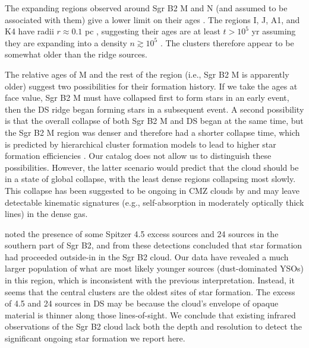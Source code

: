 \documentclass[twocolumn]{aastex61}
\begin{document}
The expanding \hii regions observed around Sgr B2 M and N (and assumed to be
associated with them) give a lower limit on their ages \citep[assuming steady
expansion, which may not be a correct model;][]{Peters2010b,De-Pree2014a}.  The
\hii regions I, J, A1, and K4 have radii $r\approx0.1$ pc \citep{Gaume1995a},
suggesting their ages are at least $t>10^5$ yr assuming they are expanding into
a density $n\gtrsim10^5$ \percc \citep{De-Pree1995a,Schmiedeke2016a}.  The
clusters therefore appear to be somewhat older than the ridge sources.


The relative ages of M and the rest of the region (i.e., Sgr B2 M is apparently
older) suggest two possibilities for their formation history.  If we take the
ages at face value, Sgr B2 M must have collapsed first to form stars in an
early event, then the DS ridge began forming stars in a
subsequent event.  A second possibility is that the overall collapse of both Sgr B2
M and DS began at the same time, but the Sgr B2 M region was denser and
therefore had a shorter collapse time, which is predicted by hierarchical
cluster formation models to lead to higher star formation efficiencies
\citep{Kruijssen2012a}.  Our catalog does not allow us to distinguish these
possibilities.  However, the latter scenario would predict that the cloud
should be in a state of global collapse, with the least dense regions
collapsing most slowly.  This collapse has been suggested to be ongoing in CMZ
clouds by \citet{Walker2015a,Walker2016a} and may leave detectable kinematic
signatures (e.g., self-absorption in moderately optically thick lines) in the
dense gas.


\citet{Yusef-Zadeh2009a} noted the presence of some Spitzer 4.5 \um excess
sources and 24 \um sources in the southern part of Sgr B2, and from these
detections concluded that star formation had proceeded outside-in in the Sgr B2
cloud.  Our data have revealed a much larger population of what are most likely
younger sources (dust-dominated YSOs) in this region, which is
inconsistent with the previous interpretation.  Instead, it seems that the
central clusters are the oldest sites of star formation.  The excess of 4.5 \um
and 24 \um sources in DS may be because the cloud's envelope of opaque material
is thinner along those lines-of-sight.  We conclude that existing infrared
observations of the Sgr B2 cloud lack both the depth and resolution to detect
the significant ongoing star formation we report here.
\end{document}

